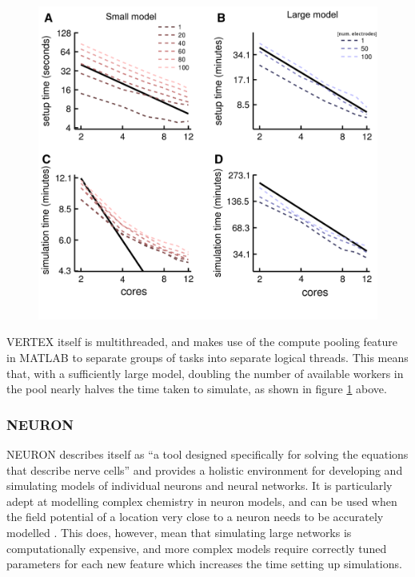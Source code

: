 \begin{figure}[h]
    \centering
    \includegraphics{figures/graphs/coresVERTEX.png}
     {\small{\cite{tomsett_virtual_2015}}}
    \label{VERTEXparallel}
\end{figure}
\vspace{1ex}

VERTEX itself is multithreaded, and makes use of the compute pooling feature in
MATLAB to separate groups of tasks into separate logical threads. This means
that, with a sufficiently large model, doubling the number of available workers
in the pool nearly halves the time taken to simulate, as shown in figure
\ref{VERTEXparallel} above.

\subsubsection{NEURON}

NEURON describes itself as ``a tool designed specifically for solving the
equations that describe nerve cells'' and provides a holistic environment for
developing and simulating models of individual neurons and neural networks. It
is particularly adept at modelling complex chemistry in neuron models, and can
be used when the field potential of a location very close to a neuron needs to
be accurately modelled \autocite{carnevale_neuron_2006}. This does, however,
mean that simulating large networks is computationally expensive, and more
complex models require correctly tuned parameters for each new feature which
increases the time setting up simulations.

